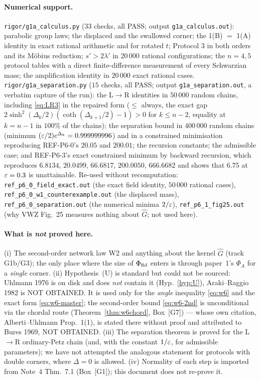 \documentclass[11pt]{article}
\theoremstyle{definition}\newtheorem{example}[theorem]{Example}
\begin{document}
\paragraph{Numerical support.}
\texttt{rigor/g1a\_calculus.py} ($33$ checks, all PASS; output
\texttt{g1a\_calculus.out}): parabolic group laws; the displaced and the swallowed corner; the
1(B) $=$ 1(A) identity in exact rational arithmetic and for rotated $t$; Protocol 3 in both orders
and its M\"obius reduction; $s'>2\lambda'$ in $20\,000$ rational configurations; the $n=4,5$
protocol tables with a direct finite-difference measurement of every Schwarzian mass; the
amplification identity in $20\,000$ exact rational cases.
\texttt{rigor/g1a\_separation.py} ($15$ checks, all PASS; output
\texttt{g1a\_separation.out}, a verbatim capture of the run): the L$\to$R identities in
$50\,000$ random chains, including \eqref{eq:LR3} in the repaired form ($\le$ always, the exact
gap $2\sinh^2(\Delta_k/2)(\coth(\Delta_{k+1}/2)-1)>0$ for $k\le n-2$, equality at $k=n-1$ in
$100\%$ of the chains); the separation bound in $400\,000$ random chains (minimum
$(\varepsilon/2)e^{\Delta_k}=0.999999996$) and in a constrained minimisation reproducing REF-P6-0's
$20.05$ and $200.01$; the recursion constants; the admissible case; and REF-P6-3's exact
constrained minimum by backward recursion, which reproduces $6.8134$, $20.0499$, $66.6817$,
$200.0050$, $666.6682$ and shows that $6.75$ at $\varepsilon=0.3$ is unattainable.
Re-used without recomputation: \texttt{ref\_p6\_0\_field\_exact.out} (the exact field identity,
$50\,000$ rational cases), \texttt{ref\_p6\_0\_w1\_counterexample.out} (the displaced mass),
\texttt{ref\_p6\_0\_separation.out} (the numerical minima $2/\varepsilon$),
\texttt{ref\_p6\_1\_fig25.out} (why VWZ Fig.~25 measures nothing about $\hat G$; not used here).

\paragraph{What is \emph{not} proved here.}
(i) The second-order network law W2 and anything about the kernel $\hat G$ (track G1b/G3); the
only place where the size of $\Phi_{\rm fid}$ enters is through paper~1's $\Phi_A$ for a
\emph{single} corner.  (ii) Hypothesis~(U) is standard but could not be sourced: Uhlmann 1976 is on disk and does
\emph{not} contain it (Hyp.~\ref{hyp:U}), Araki--Raggio 1982 is NOT OBTAINED.  It is used only
for the \emph{angle} inequality \eqref{eq:w6} and the exact form \eqref{eq:w6-master}; the
second-order bound \eqref{eq:w6-2nd} is unconditional via the chordal route
(Theorem~\ref{thm:w6chord}, Box~[G7]) --- whose own citation, Alberti--Uhlmann Prop.~1(1), is
stated there without proof and attributed to Bures 1969, NOT OBTAINED.  (iii) The separation theorem is
proved for the L$\to$R ordinary-Petz chain (and, with the constant $1/\varepsilon$, for admissible
parameters); we have not attempted the analogous statement for protocols with double corners,
where $\Delta=0$ is allowed.  (iv) Normality of each step is imported from Note~4 Thm.~7.1
(Box~[G1]); this document does not re-prove it.
\end{document}
